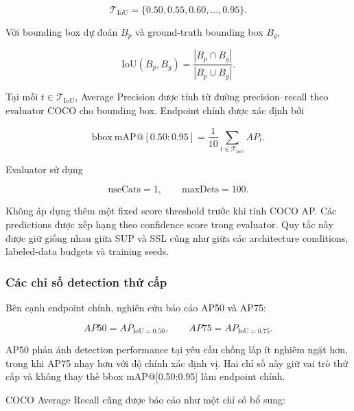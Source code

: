 \documentclass[pdflatex,sn-mathphys-num]{sn-jnl}%
\theoremstyle{thmstyleone}%
\theoremstyle{thmstyletwo}%
\theoremstyle{thmstylethree}%
\begin{document}
\begin{equation}
\mathcal{T}_{\mathrm{IoU}}
=
\{0.50, 0.55, 0.60, \ldots, 0.95\}.
\label{eq:evaluation_iou_grid}
\end{equation}

Với bounding box dự đoán \(B_p\) và ground-truth bounding box \(B_g\),

\begin{equation}
\mathrm{IoU}(B_p,B_g)
=
\frac{|B_p\cap B_g|}
{|B_p\cup B_g|}.
\label{eq:evaluation_iou}
\end{equation}

Tại mỗi \(t\in\mathcal{T}_{\mathrm{IoU}}\), Average Precision được tính
từ đường precision--recall theo evaluator COCO cho bounding box. Endpoint
chính được xác định bởi

\begin{equation}
\mathrm{bbox\ mAP}@[0.50:0.95]
=
\frac{1}{10}
\sum_{t\in\mathcal{T}_{\mathrm{IoU}}}
AP_t.
\label{eq:primary_bbox_map}
\end{equation}

Evaluator sử dụng

\begin{equation}
\mathrm{useCats}=1,
\qquad
\mathrm{maxDets}=100.
\label{eq:coco_evaluator_settings}
\end{equation}

Không áp dụng thêm một fixed score threshold trước khi tính COCO AP.
Các predictions được xếp hạng theo confidence score trong evaluator. Quy
tắc này được giữ giống nhau giữa SUP và SSL cũng như giữa các architecture
conditions, labeled-data budgets và training seeds.

\subsubsection{Các chỉ số detection thứ cấp}
\label{subsubsec:secondary_detection_metrics}

Bên cạnh endpoint chính, nghiên cứu báo cáo AP50 và AP75:

\begin{equation}
AP50=AP_{\mathrm{IoU}=0.50},
\qquad
AP75=AP_{\mathrm{IoU}=0.75}.
\label{eq:ap50_ap75}
\end{equation}

AP50 phản ánh detection performance tại yêu cầu chồng lấp ít nghiêm ngặt
hơn, trong khi AP75 nhạy hơn với độ chính xác định vị. Hai chỉ số này giữ
vai trò thứ cấp và không thay thế bbox mAP@[0.50:0.95] làm endpoint chính.

COCO Average Recall cũng được báo cáo như một chỉ số bổ sung:
\end{document}
